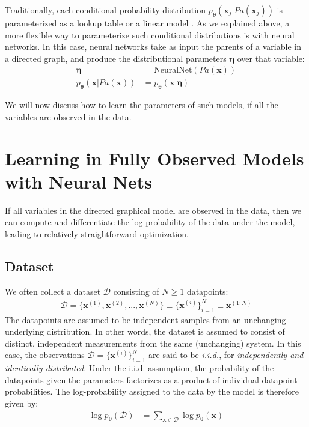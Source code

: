 \documentclass[MAL,biber]{nowfnt} %
\newcommand{\bb}[1]{\mathbf{#1}}
\newcommand{\bx}{\bb{x}}
\newcommand{\bT}{\boldsymbol{\theta}}
\newcommand{\boldeta}{\boldsymbol{\eta}}
\newcommand{\pT}{p_{\bT}}
\begin{document}
Traditionally, each conditional probability distribution $\pT(\bx_j | Pa(\bx_j))$ is parameterized as a lookup table or a linear model \citep{koller2009probabilistic}. As we explained above, a more flexible way to parameterize such conditional distributions is with neural networks. In this case, neural networks take as input the parents of a variable in a directed graph, and produce the distributional parameters $\boldeta$ over that variable:
\begin{align}
\boldeta &= \text{NeuralNet}(Pa(\bx))\\
\pT(\bx|Pa(\bx)) &= \pT(\bx|\boldeta)
\label{eq:nnconditoinal}
\end{align}

We will now discuss how to learn the parameters of such models, if all the variables are observed in the data.

\section{Learning in Fully Observed Models with Neural Nets}

If all variables in the directed graphical model are observed in the data, then we can compute and differentiate the log-probability of the data under the model, leading to relatively straightforward optimization.

\subsection{Dataset}
We often collect a dataset $\mathcal{D}$ consisting of $N \geq 1$ datapoints:
\begin{align}
\mathcal{D}  = \{\bx^{(1)}, \bx^{(2)}, ..., \bx^{(N)} \} \equiv \{\bx^{(i)}\}_{i=1}^N \equiv \bx^{(1:N)}
\end{align}
The datapoints are assumed to be independent samples from an unchanging underlying distribution. In other words, the dataset is assumed to consist of distinct, independent measurements from the same (unchanging) system. In this case, the observations $\mathcal{D} = \{\bx^{(i)}\}_{i=1}^N$ are said to be \emph{i.i.d.}, for \emph{independently and identically distributed}. Under the i.i.d. assumption, the probability of the datapoints given the parameters factorizes as a product of individual datapoint probabilities. The log-probability assigned to the data by the model is therefore given by:
\begin{align}
\log \pT(\mathcal{D}) 
&= \sum_{\bx \in \mathcal{D}} \log \pT(\bx)
\label{eq:iid2}
\end{align}
\end{document}
